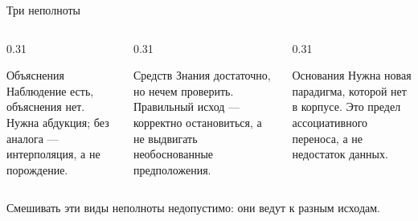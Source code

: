 \documentclass[aspectratio=169,11pt]{beamer}
\begin{document}
\begin{frame}[shrink=2]{Три неполноты}
  \begin{columns}[T,onlytextwidth]
    \begin{column}{0.31\textwidth}
      \begin{block}{Объяснения}
        Наблюдение есть, объяснения нет. Нужна абдукция; без аналога ---
        интерполяция, а не порождение.
      \end{block}
    \end{column}
    \begin{column}{0.31\textwidth}
      \begin{block}{Средств}
        Знания достаточно, но нечем проверить. Правильный исход ---
        корректно остановиться, а не выдвигать необоснованные предположения.
      \end{block}
    \end{column}
    \begin{column}{0.31\textwidth}
      \begin{block}{Основания}
        Нужна новая парадигма, которой нет в корпусе. Это предел
        ассоциативного переноса, а не недостаток данных.
      \end{block}
    \end{column}
  \end{columns}

  \vspace{5mm}
  \begin{center}
    \large
    Смешивать эти виды неполноты недопустимо: они ведут к разным исходам.
  \end{center}
\end{frame}
\end{document}
